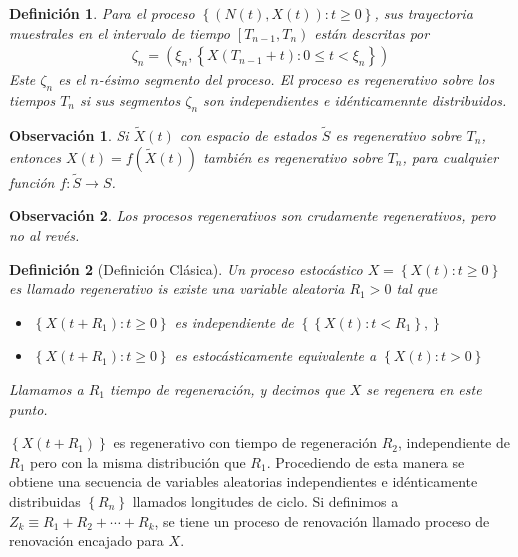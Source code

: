\documentclass{article}
\newtheorem{Def}{Definición}
\newtheorem{Obs}{Observación}
\begin{document}
\begin{Def}
Para el proceso $\left\{\left(N\left(t\right),X\left(t\right)\right):t\geq0\right\}$, sus trayectoria muestrales en el intervalo de tiempo $\left[T_{n-1},T_{n}\right)$ est\'an descritas por
\begin{eqnarray*}
\zeta_{n}=\left(\xi_{n},\left\{X\left(T_{n-1}+t\right):0\leq t<\xi_{n}\right\}\right)
\end{eqnarray*}
Este $\zeta_{n}$ es el $n$-\'esimo segmento del proceso. El proceso es regenerativo sobre los tiempos $T_{n}$ si sus segmentos $\zeta_{n}$ son independientes e id\'enticamennte distribuidos.
\end{Def}


\begin{Obs}
Si $\tilde{X}\left(t\right)$ con espacio de estados $\tilde{S}$ es regenerativo sobre $T_{n}$, entonces $X\left(t\right)=f\left(\tilde{X}\left(t\right)\right)$ tambi\'en es regenerativo sobre $T_{n}$, para cualquier funci\'on $f:\tilde{S}\rightarrow S$.
\end{Obs}

\begin{Obs}
Los procesos regenerativos son crudamente regenerativos, pero no al rev\'es.
\end{Obs}

\begin{Def}[Definici\'on Cl\'asica]
Un proceso estoc\'astico $X=\left\{X\left(t\right):t\geq0\right\}$ es llamado regenerativo is existe una variable aleatoria $R_{1}>0$ tal que
\begin{itemize}
\item[i)] $\left\{X\left(t+R_{1}\right):t\geq0\right\}$ es independiente de $\left\{\left\{X\left(t\right):t<R_{1}\right\},\right\}$
\item[ii)] $\left\{X\left(t+R_{1}\right):t\geq0\right\}$ es estoc\'asticamente equivalente a $\left\{X\left(t\right):t>0\right\}$
\end{itemize}

Llamamos a $R_{1}$ tiempo de regeneraci\'on, y decimos que $X$ se regenera en este punto.
\end{Def}

$\left\{X\left(t+R_{1}\right)\right\}$ es regenerativo con tiempo de regeneraci\'on $R_{2}$, independiente de $R_{1}$ pero con la misma distribuci\'on que $R_{1}$. Procediendo de esta manera se obtiene una secuencia de variables aleatorias independientes e id\'enticamente distribuidas $\left\{R_{n}\right\}$ llamados longitudes de ciclo. Si definimos a $Z_{k}\equiv R_{1}+R_{2}+\cdots+R_{k}$, se tiene un proceso de renovaci\'on llamado proceso de renovaci\'on encajado para $X$.
\end{document}
